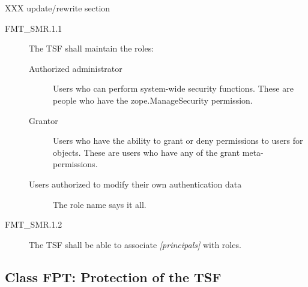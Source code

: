 \documentclass[10pt,a4paper,english]{book}
\begin{document}
XXX update/rewrite section
\begin{description}
\item[FMT{\_}SMR.1.1]

The TSF shall maintain the roles:
\begin{description}
\item[Authorized administrator]

Users who can perform system-wide security functions. These are
people who have the zope.ManageSecurity permission.

\item[Grantor ]

Users who have the ability to grant or deny permissions to
users for objects.  These are users who have any of the grant
meta-permissions.

\item[Users authorized to modify their own authentication data]

The role name says it all.

\end{description}

\item[FMT{\_}SMR.1.2]

The TSF shall be able to associate \emph{{[}principals]} with roles.

\end{description}



\hypertarget{class-fpt-protection-of-the-tsf}{}
\subsection{Class FPT: Protection of the TSF}



\hypertarget{fpt-amt-1-abstract-machine-testing}{}
\end{document}
